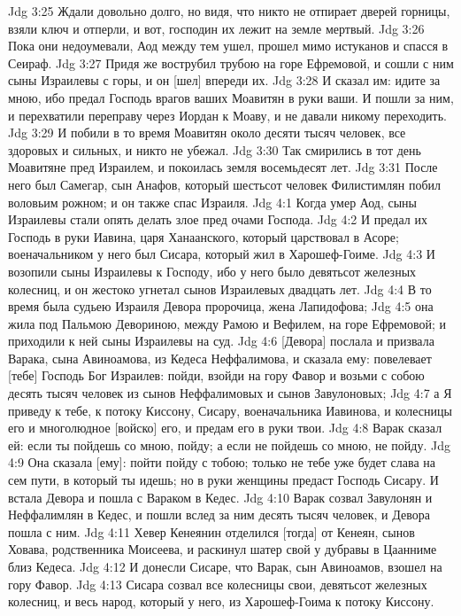 Jdg 3:25  Ждали довольно долго, но видя, что никто не отпирает дверей горницы, взяли ключ и отперли, и вот, господин их лежит на земле мертвый.
Jdg 3:26  Пока они недоумевали, Аод между тем ушел, прошел мимо истуканов и спасся в Сеираф.
Jdg 3:27  Придя же вострубил трубою на горе Ефремовой, и сошли с ним сыны Израилевы с горы, и он [шел] впереди их.
Jdg 3:28  И сказал им: идите за мною, ибо предал Господь врагов ваших Моавитян в руки ваши. И пошли за ним, и перехватили переправу через Иордан к Моаву, и не давали никому переходить.
Jdg 3:29  И побили в то время Моавитян около десяти тысяч человек, все здоровых и сильных, и никто не убежал.
Jdg 3:30  Так смирились в тот день Моавитяне пред Израилем, и покоилась земля восемьдесят лет.
Jdg 3:31  После него был Самегар, сын Анафов, который шестьсот человек Филистимлян побил воловьим рожном; и он также спас Израиля.
Jdg 4:1  Когда умер Аод, сыны Израилевы стали опять делать злое пред очами Господа.
Jdg 4:2  И предал их Господь в руки Иавина, царя Ханаанского, который царствовал в Асоре; военачальником у него был Сисара, который жил в Харошеф-Гоиме.
Jdg 4:3  И возопили сыны Израилевы к Господу, ибо у него было девятьсот железных колесниц, и он жестоко угнетал сынов Израилевых двадцать лет.
Jdg 4:4  В то время была судьею Израиля Девора пророчица, жена Лапидофова;
Jdg 4:5  она жила под Пальмою Девориною, между Рамою и Вефилем, на горе Ефремовой; и приходили к ней сыны Израилевы на суд.
Jdg 4:6  [Девора] послала и призвала Варака, сына Авиноамова, из Кедеса Неффалимова, и сказала ему: повелевает [тебе] Господь Бог Израилев: пойди, взойди на гору Фавор и возьми с собою десять тысяч человек из сынов Неффалимовых и сынов Завулоновых;
Jdg 4:7  а Я приведу к тебе, к потоку Киссону, Сисару, военачальника Иавинова, и колесницы его и многолюдное [войско] его, и предам его в руки твои.
Jdg 4:8  Варак сказал ей: если ты пойдешь со мною, пойду; а если не пойдешь со мною, не пойду.
Jdg 4:9  Она сказала [ему]: пойти пойду с тобою; только не тебе уже будет слава на сем пути, в который ты идешь; но в руки женщины предаст Господь Сисару. И встала Девора и пошла с Вараком в Кедес.
Jdg 4:10  Варак созвал Завулонян и Неффалимлян в Кедес, и пошли вслед за ним десять тысяч человек, и Девора пошла с ним.
Jdg 4:11  Хевер Кенеянин отделился [тогда] от Кенеян, сынов Ховава, родственника Моисеева, и раскинул шатер свой у дубравы в Цаанниме близ Кедеса.
Jdg 4:12  И донесли Сисаре, что Варак, сын Авиноамов, взошел на гору Фавор.
Jdg 4:13  Сисара созвал все колесницы свои, девятьсот железных колесниц, и весь народ, который у него, из Харошеф-Гоима к потоку Киссону.
